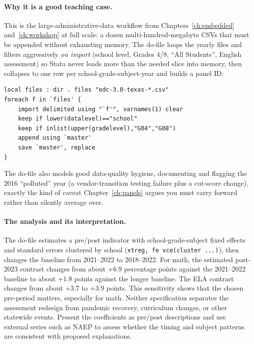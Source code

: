 \documentclass[
    a4paper,
    fontsize=10pt,
    twoside=true,
    numbers=noenddot,
]{kaobook}
\begin{document}
\paragraph{Why it is a good teaching case.} This is the large-administrative-data workflow from Chapters~\ref{ch:embedded} and~\ref{ch:workshop} at full scale: a dozen multi-hundred-megabyte CSVs that must be appended without exhausting memory. The do-file loops the yearly files and filters aggressively \emph{on import} (school level, Grades 4/8, \enquote{All Students}, English assessment) so Stata never loads more than the needed slice into memory, then collapses to one row per school-grade-subject-year and builds a panel ID:
\par
{\footnotesize
\begin{verbatim}
local files : dir . files "edc-3.0-texas-*.csv"
foreach f in `files' {
    import delimited using "`f'", varnames(1) clear
    keep if lower(datalevel)=="school"
    keep if inlist(upper(gradelevel),"G04","G08")
    append using `master'
    save `master', replace
}
\end{verbatim}
}
The do-file also models good data-quality hygiene, documenting and flagging the 2016 \enquote{polluted} year (a vendor-transition testing failure plus a cut-score change), exactly the kind of caveat Chapter~\ref{ch:panels} argues you must carry forward rather than silently average over.

\paragraph{The analysis and its interpretation.} The do-file estimates a pre/post indicator with school-grade-subject fixed effects and standard errors clustered by school (\texttt{xtreg, fe vce(cluster ...)}), then changes the baseline from 2021--2022 to 2018--2022. For math, the estimated post-2023 contrast changes from about $+6.9$ percentage points against the 2021--2022 baseline to about $+1.8$ points against the longer baseline. The ELA contrast changes from about $+3.7$ to $+3.9$ points. This sensitivity shows that the chosen pre-period matters, especially for math. Neither specification separates the assessment redesign from pandemic recovery, curriculum changes, or other statewide events. Present the coefficients as pre/post descriptions and use external series such as NAEP to assess whether the timing and subject patterns are consistent with proposed explanations.
\end{document}
